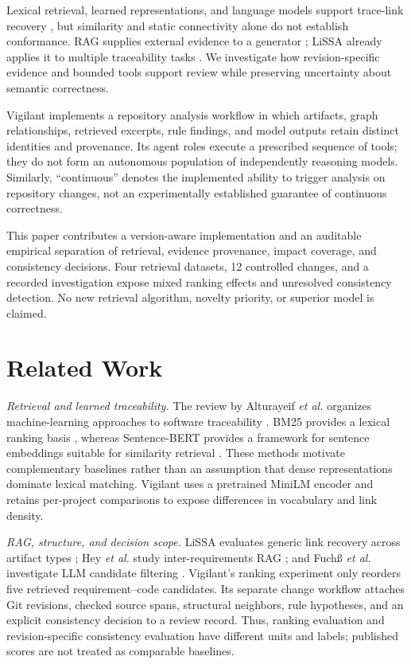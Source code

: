 \documentclass[conference,letterpaper,10pt]{IEEEtran}
\begin{document}
Lexical retrieval, learned representations, and language models support trace-link recovery \cite{slr}, but similarity and static connectivity alone do not establish conformance. RAG supplies external evidence to a generator \cite{rag}; LiSSA already applies it to multiple traceability tasks \cite{lissa}. We investigate how revision-specific evidence and bounded tools support review while preserving uncertainty about semantic correctness.

Vigilant implements a repository analysis workflow in which artifacts, graph relationships, retrieved excerpts, rule findings, and model outputs retain distinct identities and provenance. Its agent roles execute a prescribed sequence of tools; they do not form an autonomous population of independently reasoning models. Similarly, ``continuous'' denotes the implemented ability to trigger analysis on repository changes, not an experimentally established guarantee of continuous correctness.

This paper contributes a version-aware implementation and an auditable empirical separation of retrieval, evidence provenance, impact coverage, and consistency decisions. Four retrieval datasets, 12 controlled changes, and a recorded investigation expose mixed ranking effects and unresolved consistency detection. No new retrieval algorithm, novelty priority, or superior model is claimed.

\section{Related Work}
\textit{Retrieval and learned traceability.} The review by Alturayeif \emph{et al.} organizes machine-learning approaches to software traceability \cite{slr}. BM25 provides a lexical ranking basis \cite{bm25}, whereas Sentence-BERT provides a framework for sentence embeddings suitable for similarity retrieval \cite{sbert}. These methods motivate complementary baselines rather than an assumption that dense representations dominate lexical matching. Vigilant uses a pretrained MiniLM encoder and retains per-project comparisons to expose differences in vocabulary and link density.

\textit{RAG, structure, and decision scope.} LiSSA evaluates generic link recovery across artifact types \cite{lissa}; Hey \emph{et al.} study inter-requirements RAG \cite{reqrag}; and Fuch\ss{} \emph{et al.} investigate LLM candidate filtering \cite{ensemble}. Vigilant's ranking experiment only reorders five retrieved requirement--code candidates. Its separate change workflow attaches Git revisions, checked source spans, structural neighbors, rule hypotheses, and an explicit consistency decision to a review record. Thus, ranking evaluation and revision-specific consistency evaluation have different units and labels; published scores are not treated as comparable baselines.
\end{document}
